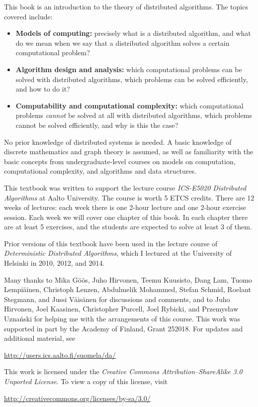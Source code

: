 
This book is an introduction to the theory of distributed algorithms. The topics covered include:
\begin{itemize}
    \item \textbf{Models of computing:} precisely what is a distributed algorithm, and what do we mean when we say that a distributed algorithm solves a certain computational problem?
    \item \textbf{Algorithm design and analysis:} which computational problems can be solved with distributed algorithms, which problems can be solved efficiently, and how to do it?
    \item \textbf{Computability and computational complexity:} which computational problems \emph{cannot} be solved at all with distributed algorithms, which problems cannot be solved efficiently, and why is this the case?
\end{itemize}
No prior knowledge of distributed systems is needed. A basic knowledge of discrete mathematics and graph theory is assumed, as well as familiarity with the basic concepts from undergraduate-level courses on models on computation, computational complexity, and algorithms and data structures.



This textbook was written to support the lecture course \emph{ICS-E5020 Distributed Algorithms} at Aalto University. The course is worth 5 ETCS credits. There are 12 weeks of lectures: each week there is one 2-hour lecture and one 2-hour exercise session. Each week we will cover one chapter of this book. In each chapter there are at least 5 exercises, and the students are expected to solve at least 3 of them.

Prior versions of this textbook have been used in the lecture course of \emph{Deterministic Distributed Algorithms}, which I lectured at the University of Helsinki in 2010, 2012, and 2014.



Many thanks to Mika G\"o\"os, Juho Hirvonen, Tee\-mu Kuu\-sisto, Dang Lam, Tuo\-mo Lem\-pi\"a\-inen, Christoph Lenzen, Abdulmelik Mohammed, Stefan Schmid, Roelant Stegmann, and Jussi V\"ai\-s\"a\-nen for discussions and comments, and to Juho Hirvonen, Joel Kaasinen, Christopher Purcell, Joel Rybicki, and Przemys\l{}aw Uzna\'nski for helping me with the arrangements of this course. This work was supported in part by the Academy of Finland, Grant 252018. For updates and additional material, see
\begin{center}
    \url{http://users.ics.aalto.fi/suomela/da/}
\end{center}



\begin{samepage}
This work is licensed under the \emph{Creative Commons Attribution--ShareAlike 3.0 Unported License}. To view a copy of this license, visit
\begin{center}
    \url{http://creativecommons.org/licenses/by-sa/3.0/}
\end{center}
\end{samepage}
